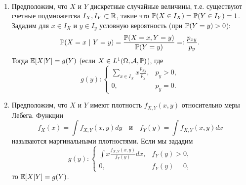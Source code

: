 \begin{exmp} \label{exmp1.16} \
	\begin{enumerate}
		\item Предположим, что $X$ и $Y$ дискретные случайные величины, т.е. существуют счетные подмножетсва $I_X, I_Y \subset \mathbb{R}$, такие что $\mathbb{P}(X \in I_X)=\mathbb{P}(Y \in I_Y)=1$. Зададим для $x \in I_X$ и $y \in I_y$ условную вероятность (при $\mathbb{P}(Y=y)>0$):
		\[ \mathbb{P}(X=x\ |\ Y=y)=\frac{\mathbb{P}(X=x, Y=y)}{\mathbb{P}(Y=y)}=:\frac{p_{xy}}{p_y}.\]
		Тогда $\mathbb{E}[X|Y]=g(Y)$ (если $X \in L^1(\Omega, \mathcal{A}, \mathbb{P})$), где
		\[ g(y) :
		\left \{
		\begin{array}{ll}
		\sum_{x \in I_X} x \frac{p_{xy}}{p_y}, & p_y>0, \\
		0, & p_y=0.
		\end{array}
		\right.
		\]
		\item Предположим, что $X$ и $Y$ имеют плотность $f_{X,Y}(x,y)$ относительно меры Лебега. Функции
		\[ f_X(x)=\int f_{X,Y}(x,y)dy \quad \text{и} \quad f_Y(y)=\int f_{X,Y}(x,y)dx \]
		называются маргинальными плотностями. Если мы зададим
		\[ g(y) :
		\left \{
		\begin{array}{ll}
		\int x \frac{f_{X,Y}(x,y)}{f_Y(y)}dx, & f_Y(y)>0, \\
		0, & f_Y(y)=0,
		\end{array}
		\right.
		\]
		то $\mathbb{E}[X|Y]=g(Y)$.
	\end{enumerate}
\end{exmp}
